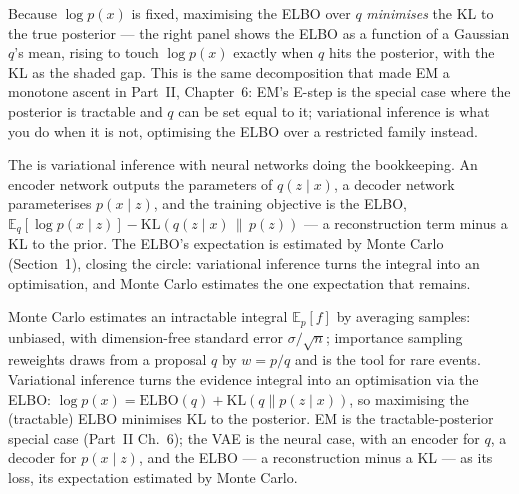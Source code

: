 \documentclass[11pt]{article}
\begin{document}
Because $\log p(x)$ is fixed, maximising the ELBO over $q$ \emph{minimises} the
KL to the true posterior --- the right panel shows the ELBO as a function of a
Gaussian $q$'s mean, rising to touch $\log p(x)$ exactly when $q$ hits the
posterior, with the KL as the shaded gap. This is the same decomposition that
made EM a monotone ascent in Part~II, Chapter~6: EM's E-step is the special case
where the posterior is tractable and $q$ can be set equal to it; variational
inference is what you do when it is not, optimising the ELBO over a restricted
family instead.

\begin{example}
The  is variational inference with neural networks doing the
bookkeeping. An encoder network outputs the parameters of $q(z\mid x)$, a decoder
network parameterises $p(x\mid z)$, and the training objective is the ELBO,
$\mathbb{E}_{q}[\log p(x\mid z)] - \mathrm{KL}(q(z\mid x)\,\|\,p(z))$ --- a
reconstruction term minus a KL to the prior. The ELBO's expectation is estimated
by Monte Carlo (Section~1), closing the circle: variational inference turns the
integral into an optimisation, and Monte Carlo estimates the one expectation
that remains.
\end{example}

\begin{summarybox}
Monte Carlo estimates an intractable integral $\mathbb{E}_p[f]$ by averaging
samples: unbiased, with dimension-free standard error $\sigma/\sqrt n$;
importance sampling reweights draws from a proposal $q$ by $w=p/q$ and is the
tool for rare events. Variational inference turns the evidence integral into an
optimisation via the ELBO: $\log p(x)=\mathrm{ELBO}(q)+\mathrm{KL}(q\|p(z\mid
x))$, so maximising the (tractable) ELBO minimises KL to the posterior. EM is the
tractable-posterior special case (Part~II Ch.~6); the VAE is the neural case,
with an encoder for $q$, a decoder for $p(x\mid z)$, and the ELBO --- a
reconstruction minus a KL --- as its loss, its expectation estimated by Monte
Carlo.
\end{summarybox}
\end{document}
